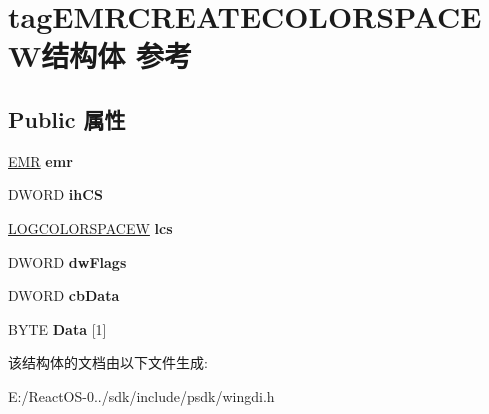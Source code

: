 \hypertarget{structtag_e_m_r_c_r_e_a_t_e_c_o_l_o_r_s_p_a_c_e_w}{}\section{tag\+E\+M\+R\+C\+R\+E\+A\+T\+E\+C\+O\+L\+O\+R\+S\+P\+A\+C\+E\+W结构体 参考}
\label{structtag_e_m_r_c_r_e_a_t_e_c_o_l_o_r_s_p_a_c_e_w}
\subsection*{Public 属性}
\begin{DoxyCompactItemize}
\item 
\mbox{\label{structtag_e_m_r_c_r_e_a_t_e_c_o_l_o_r_s_p_a_c_e_w_a5bc94cdeffb3b4fbeced6b39d3498f60}} 
\hyperlink{structtag_e_m_r}{E\+MR} {\bfseries emr}
\item 
\mbox{\label{structtag_e_m_r_c_r_e_a_t_e_c_o_l_o_r_s_p_a_c_e_w_a848eeab8696175f3aaaa8951810bb6d9}} 
D\+W\+O\+RD {\bfseries ih\+CS}
\item 
\mbox{\label{structtag_e_m_r_c_r_e_a_t_e_c_o_l_o_r_s_p_a_c_e_w_abd676cb71c9e57b7bce795463889f92c}} 
\hyperlink{structtag_l_o_g_c_o_l_o_r_s_p_a_c_e_w}{L\+O\+G\+C\+O\+L\+O\+R\+S\+P\+A\+C\+EW} {\bfseries lcs}
\item 
\mbox{\label{structtag_e_m_r_c_r_e_a_t_e_c_o_l_o_r_s_p_a_c_e_w_ae149f1ad3c37b586ea84efd08fe51c2f}} 
D\+W\+O\+RD {\bfseries dw\+Flags}
\item 
\mbox{\label{structtag_e_m_r_c_r_e_a_t_e_c_o_l_o_r_s_p_a_c_e_w_a3fa016fd9ea390d2d6d03a05c814a363}} 
D\+W\+O\+RD {\bfseries cb\+Data}
\item 
\mbox{\label{structtag_e_m_r_c_r_e_a_t_e_c_o_l_o_r_s_p_a_c_e_w_a0bd94c32529a6721c255057844c9865c}} 
B\+Y\+TE {\bfseries Data} \mbox{[}1\mbox{]}
\end{DoxyCompactItemize}


该结构体的文档由以下文件生成\+:\begin{DoxyCompactItemize}
\item 
E\+:/\+React\+O\+S-\/0../sdk/include/psdk/wingdi.\+h\end{DoxyCompactItemize}
